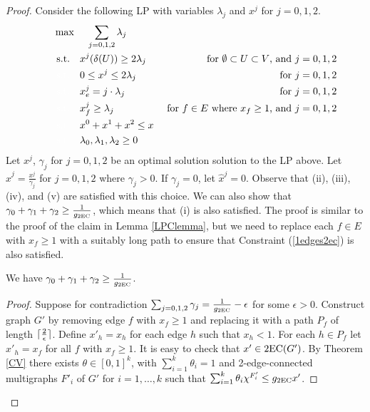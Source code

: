 \begin{proof}
	Consider the following LP with variables $\lambda_j$ and $x^j$ for $j=0,1,2$. 
	\begin{align}
		\quad\quad& \max\quad \;\sum_{j=0,1,2}\lambda_j\\
		&\;\text{s.t.} \quad x^j(\delta(U))\geq 2\lambda_j \;& \mbox{ for $\emptyset \subset U \subset V$, and $j=0,1,2$} \label{feasibility2ec}\\
		&\;{\color{white}{\text{s.t.}} }\quad 0 \leq x^j \leq 2\lambda_j\; &\mbox{ for $j=0,1,2$}\label{bound2ec}\\
		&\;{\color{white}{\text{s.t.}} }\quad x^j_e =j\cdot \lambda_j\; &\mbox{ for $j=0,1,2$}\label{branchcoordinate2ec}\\
		&\;{\color{white}{\text{s.t.}} }\quad x^j_f \geq \lambda_j \; &\mbox{ for $f\in E$ where $x_f \geq 1$, and $j=0,1,2$}\label{1edges2ec}\\
		&\;{\color{white}{\text{s.t.}} }\quad x^0 + x^1+x^2 \leq x\label{packing2ec}\\
		&\;{\color{white}{\text{s.t.}} }\quad \lambda_0,\lambda_1,\lambda_2 \geq 0
	\end{align}	Let $x^j$, $\gamma_j$ for $j=0,1,2$ be an optimal solution solution to the LP above. Let $\hat{x}^{j}=\frac{x^j}{\gamma_j}$ for $j=0,1,2$ where $\gamma_j>0$. If $\gamma_j=0$, let $\hat{x}^{j}=0$. Observe that  (ii), (iii), (iv), and (v) are satisfied with this choice. We can also show that $\gamma_0+\gamma_1+\gamma_2\geq \frac{1}{g_{\operatorname{2EC}}}$, which means that (i) is also satisfied. The proof is similar to the proof of the claim in Lemma \ref{LPClemma}, but we need to replace each $f\in E$ with $x_f\geq 1$ with a suitably long path to ensure that Constraint (\ref{1edges2ec}) is also satisfied.	
	\begin{claim}\label{CVexists}
		We have $\gamma_0 + \gamma_1+\gamma_2\geq \frac{1}{g_{\operatorname{2EC}}}$.
	\end{claim}
	\begin{proof}
		Suppose for contradiction $\sum_{j=0,1,2}\gamma_j = \frac{1}{g_{\operatorname{2EC}}} - \epsilon$ for some $\epsilon >0$. Construct graph $G'$ by removing edge $f$ with $x_f\geq 1$ and replacing it with a path $P_f$ of length $\lceil\frac{2}{\epsilon}\rceil$. Define $x'_h = x_h$ for each edge $h$ such that $x_h<1$. For each $h\in P_f$ let $x'_h= x_f$ for all $f$ with $x_f\geq 1$. It is easy to check that $x'\in \operatorname{2EC}(G')$. By Theorem \ref{CV} there exists $\theta \in [0,1]^k$, with $\sum_{i=1}^{k}\theta_i = 1$ and 2-edge-connected multigraphs $F'_i$ of $G'$ for $i=1,\ldots,k$ such that 
		$\sum_{i=1}^{k}\theta_i \chi^{F'_i}\leq g_{\operatorname{2EC}}x'$. 
		

\end{proof}
\end{proof}
